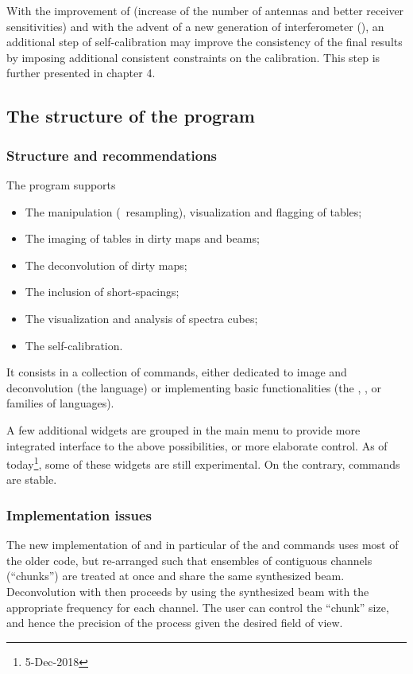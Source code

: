 With the improvement of \NOEMA{} (increase of the number of antennas 
and better receiver sensitivities) and with the advent of a new 
generation of interferometer (\ALMA{}), an additional step of 
self-calibration may improve the consistency of the final results by 
imposing additional consistent constraints on the calibration. This 
step is further presented in chapter 4.

\subsection{The structure of the \imager{} program}
\label{sub:structure}

\subsubsection{Structure and recommendations}

The \imager{} program supports
\begin{itemize}
\item The manipulation (\eg\ resampling), visualization and flagging of
  \uv{} tables;
\item The imaging of \uv{} tables in dirty maps and beams;
\item The deconvolution of dirty maps;
\item The inclusion of short-spacings; 
\item The visualization and analysis of spectra cubes;
\item The self-calibration.
\end{itemize}

It consists in a collection of commands, either dedicated to image and deconvolution
  (the  language) or implementing basic functionalities (the
  , , or   families of languages).
  
A few additional widgets are grouped in the \imager{} main menu to
provide more integrated interface to the above possibilities, or
more elaborate control. As of today\footnote{5-Dec-2018}, some
of these widgets are still experimental. On the contrary, commands
are stable.


\subsubsection{Implementation issues}

The new implementation of \imager{} and in particular of the 
 and  commands uses most of the 
older code, but re-arranged such that ensembles of contiguous channels 
(``chunks'') are treated at once and share the same synthesized beam. 
Deconvolution with  then proceeds by using the synthesized 
beam with the appropriate frequency for each channel. The user can 
control the ``chunk'' size, and hence the precision of the process 
given the desired field of view.

